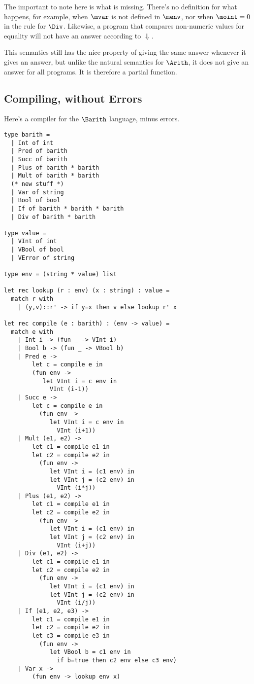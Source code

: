 The important to note here is what is missing.  There's no definition
for what happens, for example, when $\mvar$ is not defined in $\menv$,
nor when $\moint=0$ in the rule for $\Div$.  Likewise, a program that
compares non-numeric values for equality will not have an answer
according to $\Downarrow$.

This semantics still has the nice property of giving the same answer
whenever it gives an answer, but unlike the natural semantics for
$\Arith$, it does not give an answer for all programs.  It is
therefore a partial function.

\subsection{Compiling, without Errors}

Here's a compiler for the $\Barith$ language, minus errors.

\begin{verbatim}
type barith =
  | Int of int
  | Pred of barith
  | Succ of barith
  | Plus of barith * barith
  | Mult of barith * barith
  (* new stuff *)
  | Var of string
  | Bool of bool
  | If of barith * barith * barith
  | Div of barith * barith

type value =
  | VInt of int
  | VBool of bool
  | VError of string

type env = (string * value) list

let rec lookup (r : env) (x : string) : value =
  match r with
    | (y,v)::r' -> if y=x then v else lookup r' x

let rec compile (e : barith) : (env -> value) =
  match e with
    | Int i -> (fun _ -> VInt i)
    | Bool b -> (fun _ -> VBool b)
    | Pred e ->
        let c = compile e in
        (fun env ->
           let VInt i = c env in
             VInt (i-1))
    | Succ e ->
        let c = compile e in
          (fun env ->
             let VInt i = c env in
               VInt (i+1))
    | Mult (e1, e2) ->
        let c1 = compile e1 in
        let c2 = compile e2 in
          (fun env ->
             let VInt i = (c1 env) in
             let VInt j = (c2 env) in
               VInt (i*j))
    | Plus (e1, e2) ->
        let c1 = compile e1 in
        let c2 = compile e2 in
          (fun env ->
             let VInt i = (c1 env) in
             let VInt j = (c2 env) in
               VInt (i+j))
    | Div (e1, e2) ->
        let c1 = compile e1 in
        let c2 = compile e2 in
          (fun env ->
             let VInt i = (c1 env) in
             let VInt j = (c2 env) in
               VInt (i/j))
    | If (e1, e2, e3) ->
        let c1 = compile e1 in
        let c2 = compile e2 in
        let c3 = compile e3 in
          (fun env ->
             let VBool b = c1 env in
               if b=true then c2 env else c3 env)
    | Var x ->
        (fun env -> lookup env x)
\end{verbatim}


